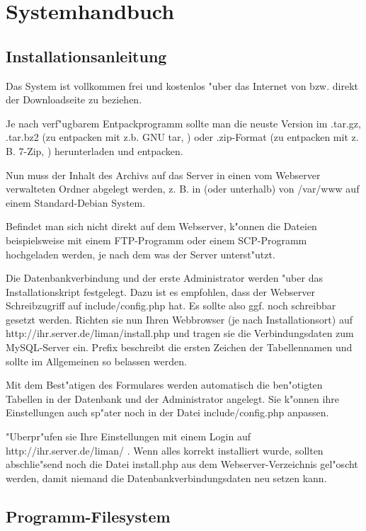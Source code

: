 \chapter{Systemhandbuch}
\section{Installationsanleitung}
Das System ist vollkommen frei und kostenlos "uber das Internet von  
bzw. direkt der 
Downloadseite  
zu beziehen.

Je nach verf"ugbarem Entpackprogramm sollte man die neuste Version im .tar.gz, 
.tar.bz2 (zu entpacken mit z.b. GNU tar, ) oder .zip-Format 
(zu entpacken mit z. B. 7-Zip, ) herunterladen und entpacken.

Nun muss der Inhalt des Archivs auf das Server in einen vom Webserver verwalteten Ordner 
abgelegt werden, z. B. in (oder unterhalb) von /var/www auf einem Standard-Debian System.

Befindet man sich nicht direkt auf dem Webserver, k"onnen die Dateien beispielsweise mit 
einem FTP-Programm oder einem SCP-Programm hochgeladen werden, je nach dem was der Server 
unterst"utzt.

Die Datenbankverbindung und der erste Administrator werden "uber das Installationskript 
festgelegt. Dazu ist es empfohlen, dass der Webserver Schreibzugriff auf include/config.php
hat. Es sollte also ggf. noch schreibbar gesetzt werden. Richten sie nun Ihren Webbrowser 
(je nach Installationsort) auf http://ihr.server.de/liman/install.php und tragen sie die 
Verbindungsdaten zum MySQL-Server ein.
Prefix beschreibt die ersten Zeichen der Tabellennamen und sollte im Allgemeinen so belassen
werden.

Mit dem Best"atigen des Formulares werden automatisch die ben"otigten Tabellen in der Datenbank 
und der Administrator angelegt. Sie k"onnen ihre Einstellungen auch sp"ater noch in der Datei
include/config.php anpassen.

"Uberpr"ufen sie Ihre Einstellungen mit einem Login auf http://ihr.server.de/liman/ .
Wenn alles korrekt installiert wurde, sollten abschlie"send noch die Datei install.php 
aus dem Webserver-Verzeichnis gel"oscht werden, damit niemand die Datenbankverbindungsdaten neu 
setzen kann.

\section{Programm-Filesystem}




